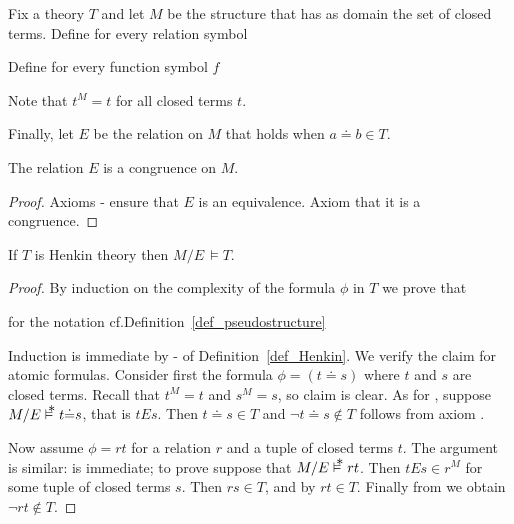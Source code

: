 \documentclass[creche.tex]{subfiles}
\begin{document}
Fix a theory $T$ and let \emph{$M$} be the structure that has as domain the set of closed terms. Define for every relation symbol


Define for every function symbol $f$


Note that $t^M=t$ for all closed terms $t$. 

Finally, let \emph{$E$} be the relation on $M$ that holds when $a{\doteq}b\in T$. 

\begin{lemma}
The relation $E$ is a congruence on $M$.
\end{lemma}

\begin{proof}
Axioms - ensure that $E$ is an equivalence. Axiom  that it is a congruence.  
\end{proof}

\begin{theorem}
If $T$ is Henkin theory then $M/E\,\models T$. 
\end{theorem}

\begin{proof}
By induction on the complexity of the formula $\phi$ in $T$ we prove that

\hfill for the notation cf.\@ Definition~\ref{def_pseudostructure}


Induction is immediate by - of Definition~\ref{def_Henkin}. We verify the claim for atomic formulas. Consider first the formula $\phi= (t{\doteq}s)$ where $t$ and $s$ are closed terms. Recall that $t^M=t$ and $s^M=s$, so claim  is clear. As for , suppose $M/E\pmodels t{\doteq}s$, that is  $tEs$. Then $t{\doteq}s\in T$ and $\neg t{\doteq}s\notin T$ follows from axiom .

Now assume $\phi=rt$ for a relation $r$ and a tuple of closed terms $t$. The argument is similar:  is immediate; to prove  suppose that $M/E\pmodels rt$. Then $tEs\in r^M$ for some tuple of closed terms $s$. Then $rs\in T$, and by  $rt\in T$. Finally from  we obtain $\neg rt\notin T$.
\end{proof}
\end{document}
